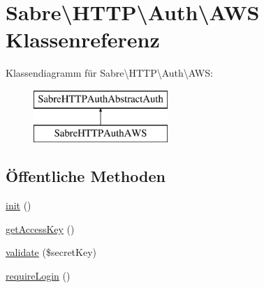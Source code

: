 \hypertarget{class_sabre_1_1_h_t_t_p_1_1_auth_1_1_a_w_s}{}\section{Sabre\textbackslash{}H\+T\+TP\textbackslash{}Auth\textbackslash{}A\+WS Klassenreferenz}
\label{class_sabre_1_1_h_t_t_p_1_1_auth_1_1_a_w_s}
Klassendiagramm für Sabre\textbackslash{}H\+T\+TP\textbackslash{}Auth\textbackslash{}A\+WS\+:\begin{figure}[H]
\begin{center}
\leavevmode
\includegraphics[height=2.000000cm]{class_sabre_1_1_h_t_t_p_1_1_auth_1_1_a_w_s}
\end{center}
\end{figure}
\subsection*{Öffentliche Methoden}
\begin{DoxyCompactItemize}
\item 
\mbox{\hyperlink{class_sabre_1_1_h_t_t_p_1_1_auth_1_1_a_w_s_a71edb3d7a3ba008150032d53ccac6766}{init}} ()
\item 
\mbox{\hyperlink{class_sabre_1_1_h_t_t_p_1_1_auth_1_1_a_w_s_a321a5193ac6b88c2667fb2c23b8ff79e}{get\+Access\+Key}} ()
\item 
\mbox{\hyperlink{class_sabre_1_1_h_t_t_p_1_1_auth_1_1_a_w_s_a0db647abf318bdd6e7b929c6927fbd69}{validate}} (\$secret\+Key)
\item 
\mbox{\hyperlink{class_sabre_1_1_h_t_t_p_1_1_auth_1_1_a_w_s_a7d8af34bc6b9b482c7558045fcdc9639}{require\+Login}} ()
\end{DoxyCompactItemize}
